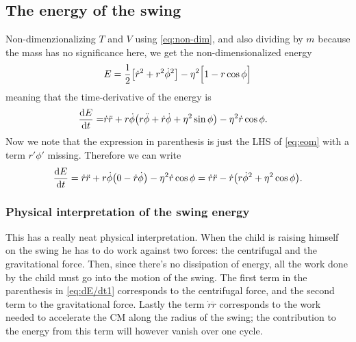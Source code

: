 \subsection{The energy of the swing}
Non-dimenzionalizing $T$ and $V$ using \eqref{eq:non-dim}, %
and also dividing by $m$ because the mass has no significance here, we
get the non-dimensionalized energy  
\begin{equation}\label{eq:E}
E=\frac{1}{2}\qty[\dot{r}^2 + {r}^2\dot{\phi}^2] 
-\eta^2\Big[1-r\cos\phi\Big] 
\end{equation}
meaning that the time-derivative of the energy is
\begin{equation}
\begin{aligned}
\dv{E}{t}
=&\dot{r}\ddot{r}+r\dot\phi\qty(r\ddot\phi + \dot{r}\dot\phi + \eta^2\sin\phi) 
-\eta^2\dot{r}\cos\phi.
\end{aligned}
\end{equation}
Now we note that the expression in parenthesis is just the LHS of
\eqref{eq:eom} with a term $r'\phi'$ missing. Therefore we can write
\begin{equation}\label{eq:dE/dt1}
\dv{E}{t}
=\dot{r}\ddot{r}+r\dot\phi\qty(0-\dot{r}\dot\phi)-\eta^2\dot{r}\cos\phi
=\dot{r}\ddot{r} - \dot{r}\qty(r\dot{\phi}^2 + \eta^2\cos\phi).
\end{equation}





\subsubsection{Physical interpretation of the swing energy}
\label{sec:phys_interp}
This has a really neat physical interpretation. When the child is
raising himself on the swing he has to do work against two forces:
the centrifugal and the gravitational force. Then, since there's no
dissipation of energy, all the work done by the child must go into the
motion of the swing. 
The first term in the parenthesis in \eqref{eq:dE/dt1} corresponds
to the centrifugal force, and the second term to the gravitational
force.
Lastly the term $\dot{r}\ddot{r}$ corresponds to the work needed to
accelerate the CM along the radius of the swing; the contribution to
the energy from this term will however vanish over one
cycle.\footnotemark{}   

